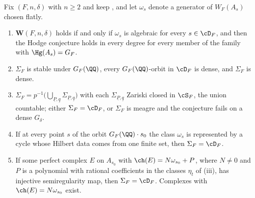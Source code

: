 \begin{theorem}
\label{thm:cmpropagation}
Fix $(F,n,\delta)$ with $n\ge2$ and keep , and let
$\omega_{s}$ denote a generator of $W_{F}(A_{s})$ chosen flatly.
\begin{enumerate}[label=\textup{(\roman*)},leftmargin=2.6em,itemsep=2pt]
\item $\mathbf{W}(F,n,\delta)$ holds if and only if $\omega_{s}$ is algebraic
  for every $s\in\cD_{F}$, and then the Hodge conjecture holds in every
  degree for every member of the family with $\Hg(A_{s})=G_{F}$.
\item $\Sigma_{F}$ is stable under $G_{F}(\QQ)$, every $G_{F}(\QQ)$-orbit in
  $\cD_{F}$ is dense, and $\Sigma_{F}$ is dense.
\item $\Sigma_{F}=p^{-1}\bigl(\bigcup_{\underline{P},\underline{q}}
  \Sigma_{\underline{P},\underline{q}}\bigr)$ with each
  $\Sigma_{\underline{P},\underline{q}}$ Zariski closed in $\cS_{F}$, the
  union countable; either $\Sigma_{F}=\cD_{F}$, or $\Sigma_{F}$ is meagre and
  the conjecture fails on a dense $G_{\delta}$.
\item If at every point $s$ of the orbit $G_{F}(\QQ)\cdot s_{0}$ the class
  $\omega_{s}$ is represented by a cycle whose Hilbert data comes from one
  finite set, then $\Sigma_{F}=\cD_{F}$.
\item If some perfect complex $E$ on $A_{s_{0}}$ with
  $\ch(E)=N\omega_{s_{0}}+P$, where $N\ne0$ and $P$ is a polynomial with
  rational coefficients in the classes $\eta_{t}$ of
  (iii), has injective semiregularity map, then
  $\Sigma_{F}=\cD_{F}$. Complexes with $\ch(E)=N\omega_{s_{0}}$ exist.
\end{enumerate}
\end{theorem}

